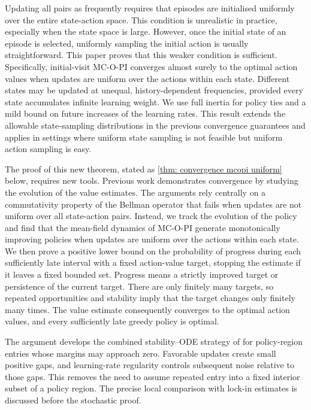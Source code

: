 Updating all pairs as frequently requires that episodes are initialised uniformly over the entire state-action space.
This condition is unrealistic in practice, especially when the state space is large.
However, once the initial state of an episode is selected, uniformly sampling the initial action is usually straightforward.
This paper proves that this weaker condition is sufficient.
Specifically, initial-visit MC-O-PI converges almost surely to the optimal action values when updates are uniform over the actions within each state.
Different states may be updated at unequal, history-dependent frequencies, provided every state accumulates infinite learning weight. We use full inertia for policy ties and a mild bound on future increases of the learning rates.
This result extends the allowable state-sampling distributions in the previous convergence guarantees
and applies in settings where uniform state sampling is not feasible but uniform action sampling is easy.






















The proof of this new theorem, stated as \autoref{thm: convergence mcopi uniform} below, requires new tools.
Previous work demonstrates convergence by studying the evolution of the value estimates. The arguments rely centrally on a commutativity property of the Bellman operator that fails when updates are not uniform over all state-action pairs.
Instead, we track the evolution of the policy and find that the mean-field dynamics of MC-O-PI generate monotonically improving policies when updates are uniform over the actions within each state.
We then prove a positive lower bound on the probability of progress during each sufficiently late interval with a fixed action-value target, stopping the estimate if it leaves a fixed bounded set. Progress means a strictly improved target or persistence of the current target. There are only finitely many targets, so repeated opportunities and stability imply that the target changes only finitely many times. The value estimate consequently converges to the optimal action values, and every sufficiently late greedy policy is optimal.

The argument develops the combined stability--ODE strategy of \citet[Section~5.4]{Kushner2003StochasticApplications} for policy-region entries whose margins may approach zero. Favorable updates create small positive gaps, and learning-rate regularity controls subsequent noise relative to those gaps. This removes the need to assume repeated entry into a fixed interior subset of a policy region. The precise local comparison with lock-in estimates is discussed before the stochastic proof.

